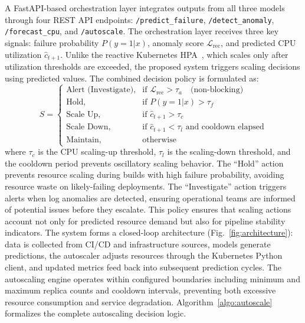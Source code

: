 \documentclass[sn-nature]{sn-jnl}
\theoremstyle{thmstyleone}
\theoremstyle{thmstyletwo}
\theoremstyle{thmstylethree}
\begin{document}
A FastAPI-based orchestration layer integrates outputs from all three models through four REST API endpoints: \texttt{/predict\_failure}, \texttt{/detect\_anomaly}, \texttt{/forecast\_cpu}, and \texttt{/autoscale}.
The orchestration layer receives three key signals: failure probability $P(y=1|x)$, anomaly score $\mathcal{L}_{\mathrm{rec}}$, and predicted CPU utilization $\hat{c}_{t+1}$.
Unlike the reactive Kubernetes HPA~\cite{kubernetesDocs}, which scales only after utilization thresholds are exceeded, the proposed system triggers scaling decisions using predicted values.
The combined decision policy is formulated as:
\begin{equation}\label{eq:policy}
S =
\begin{cases}
\text{Alert (Investigate)}, & \text{if } \mathcal{L}_{\mathrm{rec}} > \tau_a \quad \text{(non-blocking)} \\
\text{Hold}, & \text{if } P(y=1|x) > \tau_f \\
\text{Scale Up}, & \text{if } \hat{c}_{t+1} > \tau_c \\
\text{Scale Down}, & \text{if } \hat{c}_{t+1} < \tau_l \text{ and cooldown elapsed} \\
\text{Maintain}, & \text{otherwise}
\end{cases}
\end{equation}
where $\tau_c$ is the CPU scaling-up threshold, $\tau_l$ is the scaling-down threshold, and the cooldown period prevents oscillatory scaling behavior.
The ``Hold'' action prevents resource scaling during builds with high failure probability, avoiding resource waste on likely-failing deployments.
The ``Investigate'' action triggers alerts when log anomalies are detected, ensuring operational teams are informed of potential issues before they escalate.
This policy ensures that scaling actions account not only for predicted resource demand but also for pipeline stability indicators.
The system forms a closed-loop architecture (Fig.~\ref{fig:architecture}): data is collected from CI/CD and infrastructure sources, models generate predictions, the autoscaler adjusts resources through the Kubernetes Python client, and updated metrics feed back into subsequent prediction cycles.
The autoscaling engine operates within configured boundaries including minimum and maximum replica counts and cooldown intervals, preventing both excessive resource consumption and service degradation.
Algorithm~\ref{algo:autoscale} formalizes the complete autoscaling decision logic.
\end{document}
